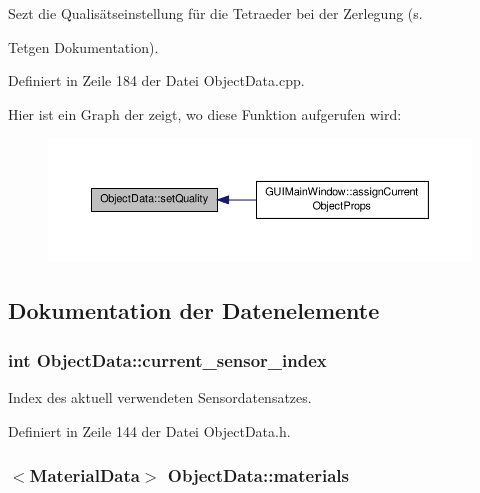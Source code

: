 Sezt die Qualisätseinstellung für die Tetraeder bei der Zerlegung (s. 

Tetgen Dokumentation). 

Definiert in Zeile 184 der Datei Object\-Data.\-cpp.



Hier ist ein Graph der zeigt, wo diese Funktion aufgerufen wird\-:\nopagebreak
\begin{figure}[H]
\begin{center}
\leavevmode
\includegraphics[width=350pt]{classObjectData_a330b3d3fa607221fae87e26f60baa0e7_icgraph}
\end{center}
\end{figure}




\subsection{Dokumentation der Datenelemente}
\hypertarget{classObjectData_a86976d7029456ac75a3e011f11e8c5f7}{
\subsubsection[{current\-\_\-sensor\-\_\-index}]{\setlength{\rightskip}{0pt plus 5cm}int Object\-Data\-::current\-\_\-sensor\-\_\-index\hspace{0.3cm}{\ttfamily [private]}}}\label{classObjectData_a86976d7029456ac75a3e011f11e8c5f7}


Index des aktuell verwendeten Sensordatensatzes. 



Definiert in Zeile 144 der Datei Object\-Data.\-h.

\hypertarget{classObjectData_a353002eeb054efed800db1b798d08a6c}{
\subsubsection[{materials}]{$<${\bf Material\-Data}$>$ Object\-Data\-::materials\hspace{0.3cm}{\ttfamily [private]}}}\label{classObjectData_a353002eeb054efed800db1b798d08a6c}


